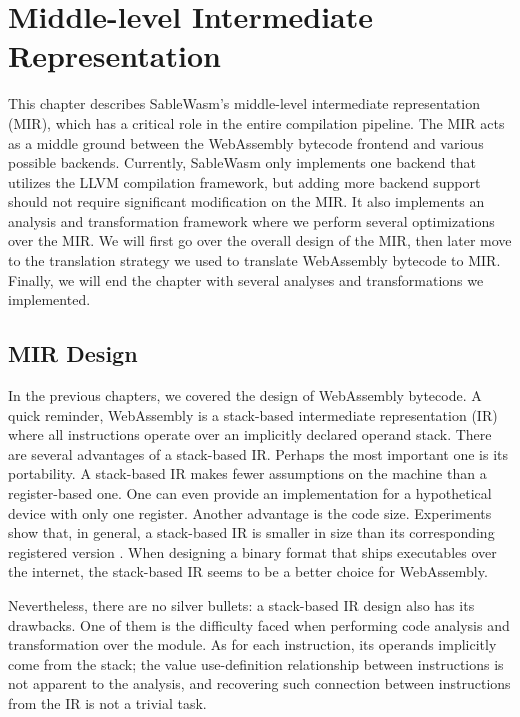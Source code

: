 \chapter{Middle-level Intermediate Representation}

This chapter describes SableWasm's middle-level intermediate representation
(MIR), which has a critical role in the entire compilation pipeline. The MIR
acts as a middle ground between the WebAssembly bytecode frontend and various
possible backends. Currently, SableWasm only implements one backend that
utilizes the LLVM compilation framework, but adding more backend support should
not require significant modification on the MIR. It also implements an
analysis and transformation framework where we perform several optimizations
over the MIR. We will first go over the overall design of the MIR, then later
move to the translation strategy we used to translate WebAssembly bytecode to
MIR. Finally, we will end the chapter with several analyses and transformations
we implemented.

\section{MIR Design}

In the previous chapters, we covered the design of WebAssembly bytecode. A quick
reminder, WebAssembly is a stack-based intermediate representation (IR) where
all instructions operate over an implicitly declared operand stack. There are
several advantages of a stack-based IR. Perhaps the most important one is its
portability. A stack-based IR makes fewer assumptions on the machine than a
register-based one. One can even provide an implementation for a hypothetical
device with only one register. Another advantage is the code size. Experiments
show that, in general, a stack-based IR is smaller in size than its
corresponding registered version \cite{stack-and-register-vm}. When designing a
binary format that ships executables over the internet, the stack-based IR seems
to be a better choice for WebAssembly.

Nevertheless, there are no silver bullets: a stack-based IR design also has its
drawbacks. One of them is the difficulty faced when performing code analysis and
transformation over the module. As for each instruction, its operands implicitly
come from the stack; the value use-definition relationship between instructions
is not apparent to the analysis, and recovering such connection between
instructions from the IR is not a trivial task.

